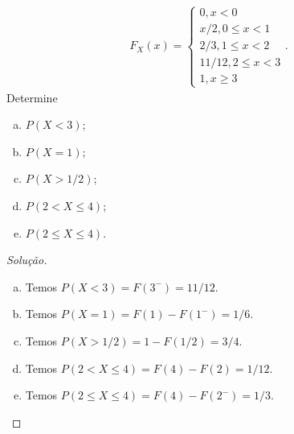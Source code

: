 \documentclass[../Notas.tex]{subfiles}
\begin{document}
\begin{enumerate}
    \begin{align*}
        F_X(x) = \begin{cases}
            0, x < 0 \\
            x/2, 0\leq x < 1 \\
            2/3, 1\leq x < 2 \\
            11/12, 2\leq x < 3 \\
            1, x\geq 3
        \end{cases}.
    \end{align*}
    Determine
    \begin{enumerate}[a)]
        \item $P(X < 3)$; 
        \item $P(X = 1)$; 
        \item $P (X > 1/2 )$; 
        \item $P(2 < X \leq 4)$; 
        \item $P(2 \leq X \leq 4)$.
    \end{enumerate}
    \begin{proof}[Solução]
        \begin{enumerate}[a)]
            \item Temos $P(X<3) = F(3^{-}) = 11/12$.
            \item Temos $P(X=1) = F(1) - F(1^-) = 1/6$.
            \item Temos $P(X>1/2) = 1 - F(1/2) = 3/4$.
            \item Temos $P(2 < X\leq 4) = F(4) - F(2) = 1/12$.
            \item Temos $P(2\leq X\leq 4) = F(4) - F(2^-) = 1/3$.
        \end{enumerate}
    \end{proof}
\end{enumerate}
\end{document}
